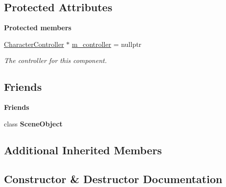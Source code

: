 \subsection*{Protected Attributes}
\begin{Indent}\textbf{ Protected members}\par
\begin{DoxyCompactItemize}
\item 
\mbox{\label{classrev_1_1_char_control_component_a99450be4d17432a79196f680a4535008}} 
\mbox{\hyperlink{classrev_1_1_character_controller}{Character\+Controller}} $\ast$ \mbox{\hyperlink{classrev_1_1_char_control_component_a99450be4d17432a79196f680a4535008}{m\+\_\+controller}} = nullptr
\begin{DoxyCompactList}\small\item\em The controller for this component. \end{DoxyCompactList}\end{DoxyCompactItemize}
\end{Indent}
\subsection*{Friends}
\begin{Indent}\textbf{ Friends}\par
\begin{DoxyCompactItemize}
\item 
\mbox{\label{classrev_1_1_char_control_component_a737b3cb474f324a74e7da2d3aeca10c9}} 
class {\bfseries Scene\+Object}
\end{DoxyCompactItemize}
\end{Indent}
\subsection*{Additional Inherited Members}


\subsection{Constructor \& Destructor Documentation}
\mbox{\label{classrev_1_1_char_control_component_ac7a09ab9128f6d06c4126ef386d47165}} 
